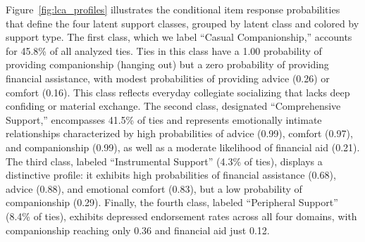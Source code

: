 \documentclass[12pt]{article}
\begin{document}
Figure~\ref{fig:lca_profiles} illustrates the conditional item response probabilities that define the four latent support classes, grouped by latent class and colored by support type. The first class, which we label ``Casual Companionship,'' accounts for 45.8\% of all analyzed ties. Ties in this class have a 1.00 probability of providing companionship (hanging out) but a zero probability of providing financial assistance, with modest probabilities of providing advice (0.26) or comfort (0.16). This class reflects everyday collegiate socializing that lacks deep confiding or material exchange. The second class, designated ``Comprehensive Support,'' encompasses 41.5\% of ties and represents emotionally intimate relationships characterized by high probabilities of advice (0.99), comfort (0.97), and companionship (0.99), as well as a moderate likelihood of financial aid (0.21). The third class, labeled ``Instrumental Support'' (4.3\% of ties), displays a distinctive profile: it exhibits high probabilities of financial assistance (0.68), advice (0.88), and emotional comfort (0.83), but a low probability of companionship (0.29). Finally, the fourth class, labeled ``Peripheral Support'' (8.4\% of ties), exhibits depressed endorsement rates across all four domains, with companionship reaching only 0.36 and financial aid just 0.12.
\end{document}

